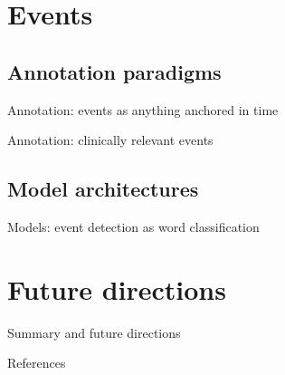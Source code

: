 \documentclass[12pt,compress]{beamer}
\begin{document}
\section{Events}


\subsection{Annotation paradigms}


\begin{frame}{Annotation: events as anything anchored in time}
\end{frame}


\begin{frame}{Annotation: clinically relevant events}
\end{frame}




\subsection{Model architectures}

\begin{frame}{Models: event detection as word classification}
\end{frame}


\section{Future directions}


\begin{frame}{Summary and future directions}
\end{frame}


\begin{frame}[allowframebreaks]{References}
\printbibliography
\end{frame}
\end{document}
